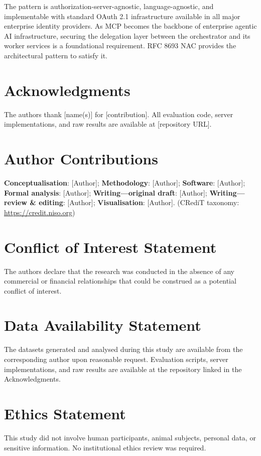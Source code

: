 \documentclass[journal]{IEEEtran}
\begin{document}
The pattern is authorization-server-agnostic, language-agnostic, and
implementable with standard OAuth 2.1 infrastructure available in all major
enterprise identity providers. As MCP becomes the backbone of enterprise agentic
AI infrastructure, securing the delegation layer between the orchestrator and its
worker services is a foundational requirement. RFC 8693 NAC provides the
architectural pattern to satisfy it.

\FloatBarrier  %

\section*{Acknowledgments}
The authors thank [name(s)] for [contribution]. All evaluation code, server
implementations, and raw results are available at [repository URL].

\section*{Author Contributions}
\textbf{Conceptualisation}: [Author]; \textbf{Methodology}: [Author];
\textbf{Software}: [Author]; \textbf{Formal analysis}: [Author];
\textbf{Writing---original draft}: [Author];
\textbf{Writing---review \& editing}: [Author];
\textbf{Visualisation}: [Author].
(CRediT taxonomy: \url{https://credit.niso.org})

\section*{Conflict of Interest Statement}
The authors declare that the research was conducted in the absence of any
commercial or financial relationships that could be construed as a potential
conflict of interest.

\section*{Data Availability Statement}
The datasets generated and analysed during this study are available from the
corresponding author upon reasonable request. Evaluation scripts, server
implementations, and raw results are available at the repository linked in the
Acknowledgments.

\section*{Ethics Statement}
This study did not involve human participants, animal subjects, personal data,
or sensitive information. No institutional ethics review was required.
\end{document}
